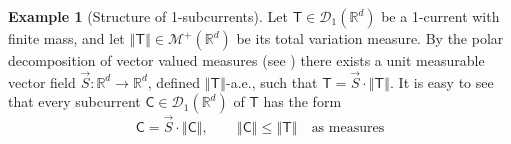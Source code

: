 \documentclass[11pt, twoside, reqno]{amsart}
\theoremstyle{definition}
\newtheorem{exmp}[thm]{Example}
\theoremstyle{remark}
\numberwithin{equation}{section}
\newcommand{\ms}[1]{\mathsf{#1}}
\newcommand{\msc}[1]{\mathscr{#1}}
\begin{document}
\begin{exmp}[Structure of 1-subcurrents]\label{rem:substru}
    Let $\ms T \in \msc D_1(\mathbb R^d)$ be a 1-current with finite mass, and let $\left\Vert \ms T\right\Vert \in \msc M^+(\mathbb R^d)$ be its total variation measure. By the polar decomposition of vector valued measures (see \cite{AFP_book}) there exists a unit measurable vector field $\vec S: \mathbb R^d  \to \mathbb R^d$, defined $\left\Vert \ms T\right\Vert$-a.e., such that $\ms T = \vec S \cdot \left\Vert \ms T \right\Vert$. It is easy to see that every subcurrent $\ms C \in \msc D_1(\mathbb R^d)$  of $\ms T$ has the form 
    $$
    \ms C = \vec S \cdot  \left\Vert \ms C \right\Vert, \qquad  \left\Vert \ms C \right\Vert \leq  \left\Vert \ms T \right\Vert \quad \text{as measures}
    $$
\end{exmp}
\end{document}
